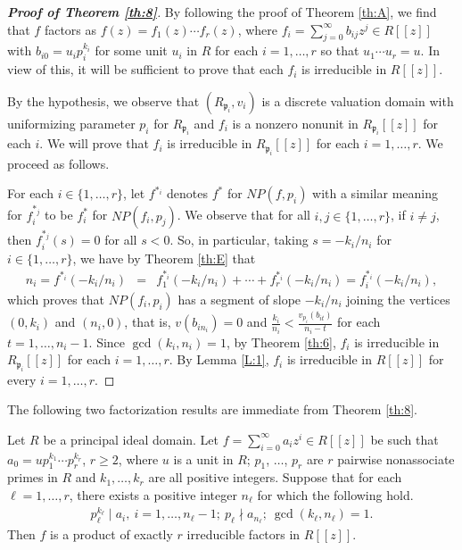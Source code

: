 \documentclass[12pt,reqno]{amsart}%
\begin{document}
\begin{proof}[\bf Proof of Theorem \ref{th:8}] By following the proof of Theorem \ref{th:A}, we find that $f$ factors as $f(z)=f_1(z)\cdots f_r(z)$, where $f_i=\sum_{j=0}^\infty b_{ij}z^j \in R[[z]]$ with $b_{i0}=u_ip_i^{k_i}$ for some unit $u_i$ in $R$ for each $i=1,\ldots, r$ so that $u_1\cdots u_r=u$. In view of this,  it will be sufficient to prove that each $f_i$ is irreducible in $R[[z]]$.

By the hypothesis, we observe that $(R_{\mathfrak{p}_i}, v_i)$ is a discrete valuation domain with uniformizing parameter $p_i$ for $R_{\mathfrak{p}_i}$ and $f_i$ is a nonzero nonunit in $R_{\mathfrak{p}_i}[[z]]$ for each $i$. We will prove that $f_i$ is irreducible in $R_{\mathfrak{p}_i}[[z]]$ for each $i=1,\ldots,r$. We proceed as follows.

For  each $i\in \{1,\ldots,r\}$, let $f^{*_i}$ denotes $f^*$  for $NP(f,p_i)$ with a similar meaning for $f_i^{*_j}$ to be $f_i^*$  for $NP(f_i,p_j)$. We observe that for all $i,j\in \{1,\ldots,r\}$, if $i\neq j$, then $f_i^{*_j}(s)=0$ for all $s<0$. So, in particular, taking $s=-k_i/n_i$ for $i\in \{1,\ldots,r\}$, we have by Theorem \ref{th:E} that
\begin{eqnarray*}
n_i=f^{*_i}(-k_i/n_i) &=& f_1^{*_i}(-k_i/n_i)+\cdots+f_r^{*_i}(-k_i/n_i)= f_i^{*_i}(-k_i/n_i),
\end{eqnarray*}
which proves that $NP(f_i,p_i)$ has a segment of slope $-k_i/n_i$ joining the vertices $(0,k_i)$ and $(n_i,0)$, that is, $v(b_{in_i})=0$ and $\frac{k_i}{n_i}<\frac{v_{p_i}(b_{it})}{n_i-t}$  for each $t=1,\ldots,n_i-1$. Since $\gcd(k_i,n_i)=1$, by Theorem \ref{th:6}, $f_i$ is irreducible in $R_{\mathfrak{p}_i}[[z]]$ for each $i=1,\ldots,r$. By Lemma \ref{L:1}, $f_i$ is irreducible in $R[[z]]$ for every $i=1,\ldots,r$.
\end{proof}
The following two factorization results are immediate from Theorem \ref{th:8}.
\begin{theorem}\label{th:7}
Let $R$ be a principal ideal domain. Let $f=\sum_{i=0}^\infty a_i z^i \in R[[z]]$ be such that $a_0=up_1^{k_1}\cdots p_r^{k_r}$, $r\geq 2$, where $u$ is a unit in $R$; $p_1$, $\ldots$, $p_r$ are $r$ pairwise nonassociate primes in $R$ and $k_1,\ldots,k_r$ are all positive integers. Suppose that for each $\ell=1,\ldots,r$, there exists a  positive integer $n_\ell$ for which the following hold.
\begin{eqnarray*}
p_\ell^{k_\ell}\mid a_i,~i=1,\ldots,n_\ell-1;~p_\ell\nmid a_{n_\ell};~\gcd(k_\ell,n_\ell)=1.
\end{eqnarray*}
Then $f$ is a product of exactly $r$ irreducible factors in $R[[z]]$.
\end{theorem}
\end{document}
